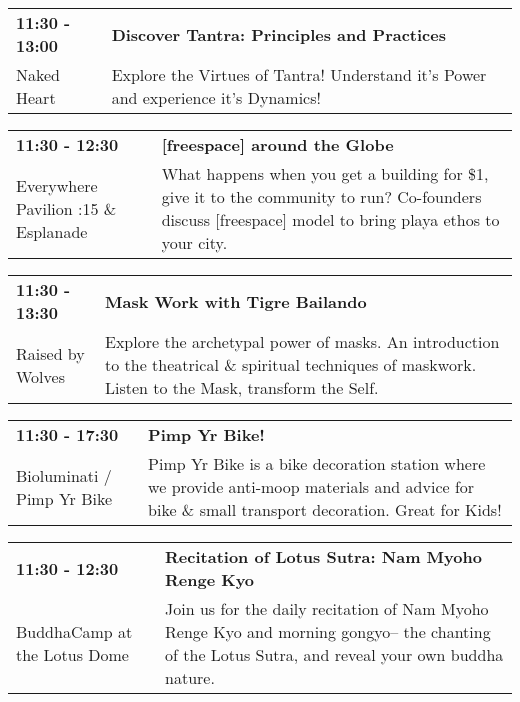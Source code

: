 \begin{tabular}{ p{1in} p{2.2in} }
    \textbf{11:30 - 13:00} & \textbf{Discover Tantra: Principles and Practices} \\
    Naked Heart \newline  & Explore the Virtues of Tantra! Understand it's Power and experience it's Dynamics! \\
    \hline 
\end{tabular}
    
\begin{tabular}{ p{1in} p{2.2in} }
    \textbf{11:30 - 12:30} & \textbf{[freespace] around the Globe} \\
    Everywhere Pavilion \newline 6:15 \& Esplanade & What happens when you get a building for \$1, give it to the community to run? Co-founders discuss [freespace] model to bring playa ethos to your city. \\
    \hline 
\end{tabular}
    
\begin{tabular}{ p{1in} p{2.2in} }
    \textbf{11:30 - 13:30} & \textbf{Mask Work with Tigre Bailando} \\
    Raised by Wolves \newline  & Explore the archetypal power of masks. An introduction to the theatrical \& spiritual techniques of maskwork. Listen to the Mask, transform the Self. \\
    \hline 
\end{tabular}
    
\begin{tabular}{ p{1in} p{2.2in} }
    \textbf{11:30 - 17:30} & \textbf{Pimp Yr Bike!} \\
    Bioluminati / Pimp Yr Bike \newline  & Pimp Yr Bike is a bike decoration station where we provide anti-moop materials and advice for bike \& small transport decoration. Great for Kids! \\
    \hline 
\end{tabular}
    
\begin{tabular}{ p{1in} p{2.2in} }
    \textbf{11:30 - 12:30} & \textbf{Recitation of Lotus Sutra: Nam Myoho Renge Kyo} \\
    BuddhaCamp at the Lotus Dome \newline  & Join us for the daily recitation of Nam Myoho Renge Kyo and morning gongyo-- the chanting of the Lotus Sutra, and reveal your own buddha nature. \\
    \hline 
\end{tabular}
    
